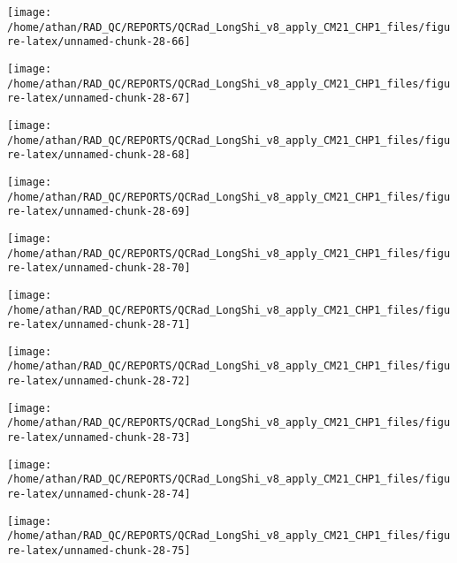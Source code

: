\documentclass[
  10pt,
  a4paper,oneside]{article}
\begin{document}
\begin{center}\texttt{[image: /home/athan/RAD\_QC/REPORTS/QCRad\_LongShi\_v8\_apply\_CM21\_CHP1\_files/figure-latex/unnamed-chunk-28-66]} \end{center}

\begin{center}\texttt{[image: /home/athan/RAD\_QC/REPORTS/QCRad\_LongShi\_v8\_apply\_CM21\_CHP1\_files/figure-latex/unnamed-chunk-28-67]} \end{center}

\begin{center}\texttt{[image: /home/athan/RAD\_QC/REPORTS/QCRad\_LongShi\_v8\_apply\_CM21\_CHP1\_files/figure-latex/unnamed-chunk-28-68]} \end{center}

\begin{center}\texttt{[image: /home/athan/RAD\_QC/REPORTS/QCRad\_LongShi\_v8\_apply\_CM21\_CHP1\_files/figure-latex/unnamed-chunk-28-69]} \end{center}

\begin{center}\texttt{[image: /home/athan/RAD\_QC/REPORTS/QCRad\_LongShi\_v8\_apply\_CM21\_CHP1\_files/figure-latex/unnamed-chunk-28-70]} \end{center}

\begin{center}\texttt{[image: /home/athan/RAD\_QC/REPORTS/QCRad\_LongShi\_v8\_apply\_CM21\_CHP1\_files/figure-latex/unnamed-chunk-28-71]} \end{center}

\begin{center}\texttt{[image: /home/athan/RAD\_QC/REPORTS/QCRad\_LongShi\_v8\_apply\_CM21\_CHP1\_files/figure-latex/unnamed-chunk-28-72]} \end{center}

\begin{center}\texttt{[image: /home/athan/RAD\_QC/REPORTS/QCRad\_LongShi\_v8\_apply\_CM21\_CHP1\_files/figure-latex/unnamed-chunk-28-73]} \end{center}

\begin{center}\texttt{[image: /home/athan/RAD\_QC/REPORTS/QCRad\_LongShi\_v8\_apply\_CM21\_CHP1\_files/figure-latex/unnamed-chunk-28-74]} \end{center}

\begin{center}\texttt{[image: /home/athan/RAD\_QC/REPORTS/QCRad\_LongShi\_v8\_apply\_CM21\_CHP1\_files/figure-latex/unnamed-chunk-28-75]} \end{center}
\end{document}
